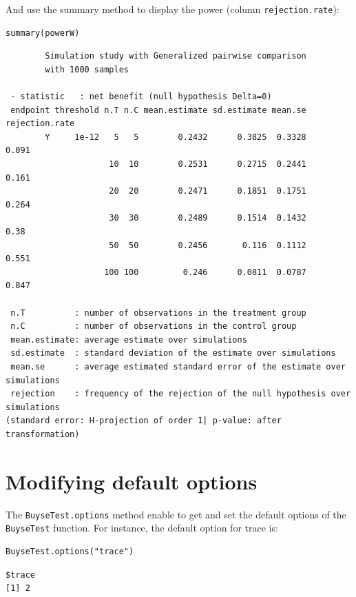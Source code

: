 \documentclass[12pt]{article}
\begin{document}
\clearpage

And use the summary method to display the power (column
\texttt{rejection.rate}):
\lstset{language=r,label= ,caption= ,captionpos=b,numbers=none}
\begin{lstlisting}
summary(powerW)
\end{lstlisting}

\begin{verbatim}
        Simulation study with Generalized pairwise comparison
        with 1000 samples

 - statistic   : net benefit (null hypothesis Delta=0)
 endpoint threshold n.T n.C mean.estimate sd.estimate mean.se rejection.rate
        Y     1e-12   5   5        0.2432      0.3825  0.3328          0.091
                     10  10        0.2531      0.2715  0.2441          0.161
                     20  20        0.2471      0.1851  0.1751          0.264
                     30  30        0.2489      0.1514  0.1432           0.38
                     50  50        0.2456       0.116  0.1112          0.551
                    100 100         0.246      0.0811  0.0787          0.847

 n.T          : number of observations in the treatment group
 n.C          : number of observations in the control group
 mean.estimate: average estimate over simulations
 sd.estimate  : standard deviation of the estimate over simulations
 mean.se      : average estimated standard error of the estimate over simulations
 rejection    : frequency of the rejection of the null hypothesis over simulations
(standard error: H-projection of order 1| p-value: after transformation)
\end{verbatim}

\clearpage

\section{Modifying default options}
\label{sec:orga635c78}
The \texttt{BuyseTest.options} method enable to get and set the default
options of the \texttt{BuyseTest} function. For instance, the default option
for trace is:
\lstset{language=r,label= ,caption= ,captionpos=b,numbers=none}
\begin{lstlisting}
BuyseTest.options("trace")
\end{lstlisting}

\begin{verbatim}
$trace
[1] 2
\end{verbatim}
\end{document}
